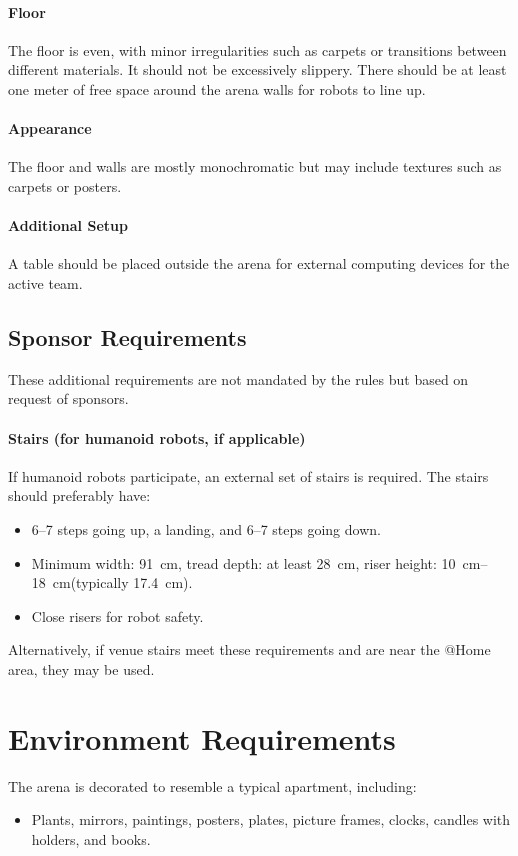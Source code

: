 \paragraph{Floor} The floor is even, with minor irregularities such as carpets or transitions between different materials. It should not be excessively slippery. There should be at least one meter of free space around the arena walls for robots to line up.

\paragraph{Appearance} The floor and walls are mostly monochromatic but may include textures such as carpets or posters.

\paragraph{Additional Setup} A table should be placed outside the arena for external computing devices for the active team.

\subsection{Sponsor Requirements}

These additional requirements are not mandated by the rules but based on request of sponsors.

\paragraph{Stairs (for humanoid robots, if applicable)} If humanoid robots participate, an external set of stairs is required. The stairs should preferably have:
\begin{itemize}
    \item 6--7 steps going up, a landing, and 6--7 steps going down.
    \item Minimum width: \qty{91}{\centi\metre}, tread depth: at least \qty{28}{\centi\metre}, riser height: \qtyrange{10}{18}{\centi\metre}(typically \qty{17.4}{\centi\metre}).
    \item Close risers for robot safety.
\end{itemize}
Alternatively, if venue stairs meet these requirements and are near the @Home area, they may be used.

\section{Environment Requirements}
The arena is decorated to resemble a typical apartment, including:
\begin{itemize}
    \item Plants, mirrors, paintings, posters, plates, picture frames, clocks, candles with holders, and books.
\end{itemize}


